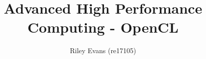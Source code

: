 \documentclass[a4paper, twocolumn, 9pt]{extarticle}
\title{\vspace{-10mm}Advanced High Performance Computing - OpenCL\vspace{-4mm}}
\author{Riley Evans (re17105)}
\date{\vspace{-3mm}}
\begin{document}
\secfont
\maketitle
\normalfont

















\end{document}
